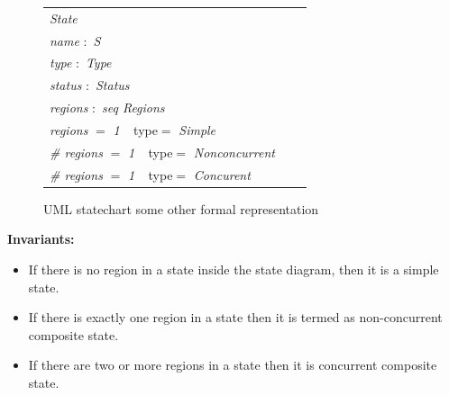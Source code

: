 \begin{figure}[ht!]
	\begin{tabular}{lll}
		\footnotesize                       
		\textit{State}       \\
		
		\footnotesize
		\textit{name}   $:$    \textit{S}  \\   
		\footnotesize
		\textit{type}   $:$    \textit{Type}  \\   
		\footnotesize
		\textit{status}   $:$    \textit{Status}      \\
		\footnotesize
		\textit{regions} $:$   \textit{seq Regions} \\
		
		\footnotesize
		\textit{regions} $=$   \textit{1} $\ \  $ {type}$=$   \textit{Simple} \\
		\footnotesize
		 \textit{\# regions} $=$   \textit{1} $\ \  $ {type}$=$   \textit{Nonconcurrent} \\
		 \textit{\# regions} $=$   \textit{1} $\ \  $ {type}$=$   \textit{Concurent} \\
		 
		
	\end{tabular}
	\caption{UML statechart some other formal representation}
	\label{statechart_formal_representation_part2}
\end{figure}

\textbf{Invariants:}
\begin{itemize}
\item  If there is no region in a state inside the state diagram, then it is a simple state.
\item  If there is exactly one region in a state then it is termed as non-concurrent composite state.
\item  If there are two or more regions in a state then it is
concurrent composite state.
\end{itemize}

